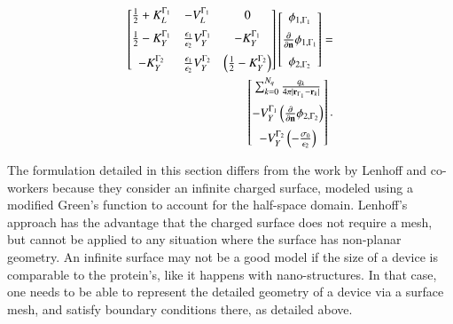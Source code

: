  \begin{align} \label{eq:matrix_dphi}
 \left[
    \begin{matrix} %
       \frac{1}{2} + K_{L}^{\Gamma_1} & -V_{L}^{\Gamma_1} & 0 \vspace{0.2cm}\\
       \frac{1}{2} - K_{Y}^{\Gamma_1} &  \frac{\epsilon_1}{\epsilon_2} V_{Y}^{\Gamma_1} & -K_{Y}^{\Gamma_1} \vspace{0.2cm} \\
       - K_{Y}^{\Gamma_2} & \frac{\epsilon_1}{\epsilon_2} V_{Y}^{\Gamma_2} & \left(\frac{1}{2} - K_{Y}^{\Gamma_2}\right) \\
    \end{matrix}
    \right] \left[ 
    \begin{matrix} %
       \phi_{1,\Gamma_1} \vspace{0.2cm} \\
       \frac{\partial}{\partial \mathbf{n}} \phi_{1,\Gamma_1} \vspace{0.2cm}\\
       \phi_{2,\Gamma_2}\\
    \end{matrix} 
     \right] =   \nonumber \\
    \left[
    \begin{matrix} %
       \sum_{k=0}^{N_q} \frac{q_k}{4\pi|\mathbf{r}_{\Gamma_1} - \mathbf{r}_k|} \vspace{0.2cm} \\
        -V_{Y}^{\Gamma_1} \left( \frac{\partial}{\partial \mathbf{n}} \phi_{2,\Gamma_2} \right) \vspace{0.2cm} \\
        -V_{Y}^{\Gamma_2} \left( -\frac{\sigma_0}{\epsilon_2} \right)
    \end{matrix}
    \right].
 \end{align}
 

The formulation detailed in this section differs from the work by Lenhoff and co-workers \cite{YoonLenhoff1992,RothLenhoff1993} because they consider an infinite charged surface, modeled using a modified Green's function to account for the half-space domain. Lenhoff's approach has the advantage that the charged surface does not require a mesh, but cannot be applied to any situation where the surface has non-planar geometry. An infinite surface may not be a good model if the size of a device is comparable to the protein's, like it happens with nano-structures.
In that case, one needs to be able to represent the detailed geometry of a device via a surface mesh, and satisfy boundary conditions there, as detailed above.

